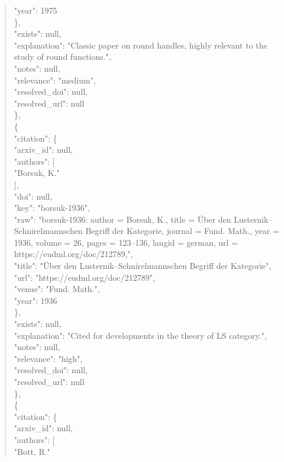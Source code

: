 \documentclass[11pt]{article}
\begin{document}
\begin{quote}
        "year": 1975\\
      \},\\
      "exists": null,\\
      "explanation": "Classic paper on round handles, highly relevant to the study of round functions.",\\
      "notes": null,\\
      "relevance": "medium",\\
      "resolved\_doi": null,\\
      "resolved\_url": null\\
    \},\\
    \{\\
      "citation": \{\\
        "arxiv\_id": null,\\
        "authors": [\\
          "Borsuk, K."\\
        ],\\
        "doi": null,\\
        "key": "borsuk-1936",\\
        "raw": "borsuk-1936: author = Borsuk, K., title = Über den Lusternik--Schnirelmannschen Begriff der Kategorie, journal = Fund. Math., year = 1936, volume = 26, pages = 123--136, langid = german, url = https://eudml.org/doc/212789,",\\
        "title": "Über den Lusternik--Schnirelmannschen Begriff der Kategorie",\\
        "url": "https://eudml.org/doc/212789",\\
        "venue": "Fund. Math.",\\
        "year": 1936\\
      \},\\
      "exists": null,\\
      "explanation": "Cited for developments in the theory of LS category.",\\
      "notes": null,\\
      "relevance": "high",\\
      "resolved\_doi": null,\\
      "resolved\_url": null\\
    \},\\
    \{\\
      "citation": \{\\
        "arxiv\_id": null,\\
        "authors": [\\
          "Bott, R."\\

\end{quote}
\end{document}
